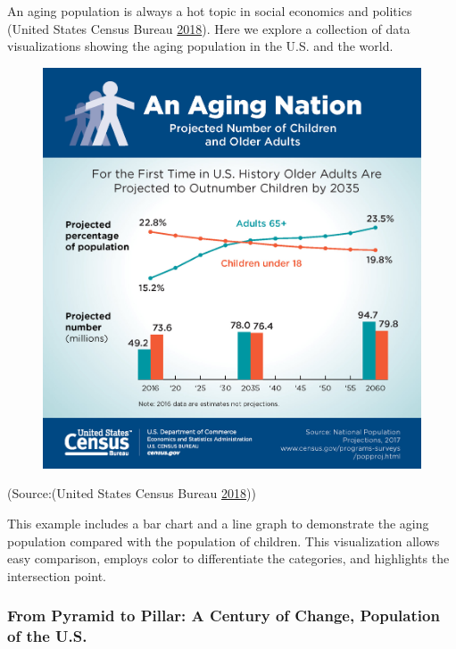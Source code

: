\documentclass[]{book}
\theoremstyle{definition}
\theoremstyle{definition}
\theoremstyle{definition}
\theoremstyle{remark}
\begin{document}
An aging population is always a hot topic in social economics and
politics (United States Census Bureau
\protect\hyperlink{ref-aging_nation}{2018}). Here we explore a
collection of data visualizations showing the aging population in the
U.S. and the world.

\begin{figure}
\centering
\includegraphics{images/aging_nation.jpg}
\caption{}
\end{figure}

(Source:(United States Census Bureau
\protect\hyperlink{ref-aging_nation}{2018}))

This example includes a bar chart and a line graph to demonstrate the
aging population compared with the population of children. This
visualization allows easy comparison, employs color to differentiate the
categories, and highlights the intersection point.

\subsubsection{From Pyramid to Pillar: A Century of Change, Population
of the
U.S.}\label{from-pyramid-to-pillar-a-century-of-change-population-of-the-u.s.}
\end{document}
